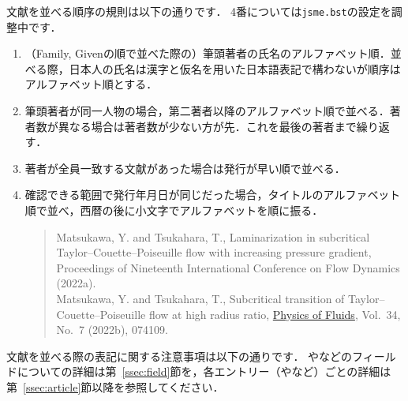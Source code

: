 \documentclass[a4paper,fleqn,uplatex,dvipdfmx]{jsarticle}
\newcommand{\jsmefile}{\texttt{jsme.bst}}
\begin{document}
文献を並べる順序の規則は以下の通りです．
4番については\jsmefile の設定を調整中です．
\begin{itembox}[l]{}
    \begin{enumerate}
        \item （Family, Givenの順で並べた際の）筆頭著者の氏名のアルファベット順．並べる際，日本人の氏名は漢字と仮名を用いた日本語表記で構わないが順序はアルファベット順とする．
        \item 筆頭著者が同一人物の場合，第二著者以降のアルファベット順で並べる．著者数が異なる場合は著者数が少ない方が先．これを最後の著者まで繰り返す．
        \item 著者が全員一致する文献があった場合は発行が早い順で並べる．
        \item 確認できる範囲で発行年月日が同じだった場合，タイトルのアルファベット順で並べ，西暦の後に小文字でアルファベットを順に振る．
        \begin{quote}
            Matsukawa, Y. and Tsukahara, T., Laminarization in subcritical Taylor--Couette--Poiseuille flow with increasing pressure gradient, Proceedings of Nineteenth International Conference on Flow Dynamics (2022a). \\
            Matsukawa, Y. and Tsukahara, T., Subcritical transition of Taylor--Couette--Poiseuille flow at high radius ratio, \href{https://doi.org/10.1063/5.0096676}{Physics of Fluids}, Vol.~34, No.~7 (2022b), 074109.
        \end{quote}
    \end{enumerate}
\end{itembox}
文献を並べる際の表記に関する注意事項は以下の通りです．
\ttauthor や\tttitle などのフィールドについての詳細は第~\ref{ssec:field}節を，各エントリー（\ttarticle や\ttbook など）ごとの詳細は第~\ref{ssec:article}節以降を参照してください．
\renewcommand\UrlFont{\rmfamily}
\end{document}
